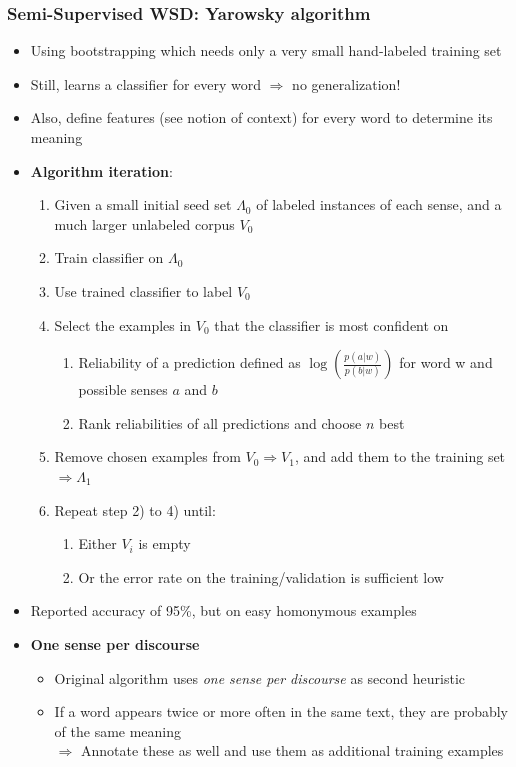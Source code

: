 \subsubsection{Semi-Supervised WSD: Yarowsky algorithm}
\begin{itemize}
	\item Using bootstrapping which needs only a very small hand-labeled training set
	\item Still, learns a classifier for every word $\Rightarrow$ no generalization!
	\item Also, define features (see notion of context) for every word to determine its meaning
	\item \textbf{Algorithm iteration}: 
	\begin{enumerate}[start=0]
		\item Given a small initial seed set $\Lambda_0$ of labeled instances of each sense, and a much larger unlabeled corpus $V_0$
		\item Train classifier on $\Lambda_0$
		\item Use trained classifier to label $V_0$
		\item Select the examples in $V_0$ that the classifier is most confident on
		\begin{enumerate}
			\item Reliability of a prediction defined as $\log\left(\frac{p(a|w)}{p(b|w)}\right)$ for word w and possible senses $a$ and $b$
			\item Rank reliabilities of all predictions and choose $n$ best
		\end{enumerate}
		\item Remove chosen examples from $V_0\Rightarrow V_1$, and add them to the training set $\Rightarrow\Lambda_1$
		\item Repeat step 2) to 4) until:
		\begin{enumerate}
			\item Either $V_i$ is empty
			\item Or the error rate on the training/validation is sufficient low
		\end{enumerate}
	\end{enumerate}
	\item Reported accuracy of 95\%, but on easy homonymous examples
	\item \textbf{One sense per discourse}
	\begin{itemize}
		\item Original algorithm uses \textit{one sense per discourse} as second heuristic
		\item If a word appears twice or more often in the same text, they are probably of the same meaning\\
		$\Rightarrow$ Annotate these as well and use them as additional training examples
	\end{itemize}
\end{itemize}
